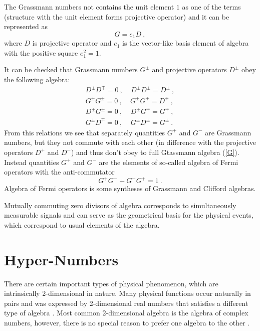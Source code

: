\documentclass[a4paper,12pt]{article}
\begin{document}
The Grassmann numbers not contains the unit element $1$ as one of the terms (structure with 
the unit element forms projective operator) and it can be represented as
\begin{equation} \label{G=D}
G = e_1 D ~,
\end{equation}
where $D$ is projective operator and $e_1$ is the vector-like basis element of algebra with 
the positive square $e_1^2 = 1$. 

It can be checked that Grassmann numbers $G^\pm $ and projective operators $D^\pm$ obey the 
following algebra:
\begin{eqnarray} \label{GD}
D^\pm D^\mp = 0 ~, ~~~~~ D^\pm D^\pm = D^\pm ~, \nonumber \\
G^\pm G^\pm = 0 ~, ~~~~~ G^\pm G^\mp = D^\mp ~, \nonumber \\
D^\pm G^\pm = 0 ~, ~~~~~ D^\pm G^\mp = G^\mp ~, \\
G^\pm D^\mp = 0 ~, ~~~~~ G^\pm D^\pm = G^\pm ~. \nonumber 
\end{eqnarray}
From this relations we see that separately quantities $G^+$ and $G^-$ are Grassmann numbers, 
but they not commute with each other (in difference with the projective operators $D^+$ and 
$D^-$) and thus don't obey to full Gtassmann algebra (\ref{G}). Instead quantities $G^+$ and 
$G^-$ are the elements of so-called algebra of Fermi operators with the anti-commutator 
\begin{equation} \label{fermi}
G^+G^- + G^-G^+ = 1~. 
\end{equation}
Algebra of Fermi operators is some syntheses of Grassmann and Clifford algebras.

Mutually commuting zero divisors of algebra corresponds to simultaneously measurable signals 
and can serve as the geometrical basis for the physical events, which correspond to usual 
elements of the algebra. 


\section{Hyper-Numbers}

There are certain important types of physical phenomenon, which are intrinsically 2-dimensional 
in nature. Many physical functions occur naturally in pairs and was expressed by 2-dimensional 
real numbers that satisfies a different type of algebra \cite{StNe}. Most common 2-dimensional 
algebra is the algebra of complex numbers, however, there is no special reason to prefer one 
algebra to the other \cite{Sa}. 
\end{document}

